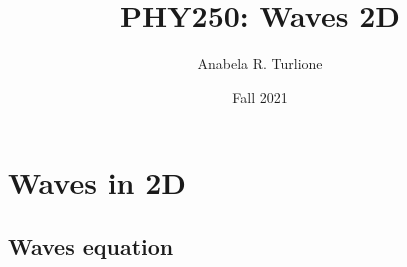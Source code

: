 \documentclass[]{beamer}
\title{PHY250: Waves 2D}    %
\author{Anabela R. Turlione}                 %
\institute{Digipen}      %
\date{Fall 2021}                    %
\begin{document}
\begin{frame}
  \titlepage
\end{frame}

\section[]{}

\begin{frame}
  \tableofcontents
\end{frame}










    
    
    
  


\section{Waves in 2D}

\subsection{Waves equation}
\end{document}
